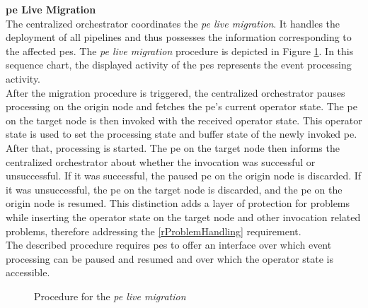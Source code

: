 \textbf{\acrlong{pe} Live Migration}\\
The centralized orchestrator coordinates the \textit{\acrshort{pe} live migration}. It handles the deployment of all pipelines and thus possesses the information corresponding to the affected \gls{pe}s. The \textit{\textit{\acrshort{pe} live migration}} procedure is depicted in Figure \ref{fOperatorStateMigration}. In this sequence chart, the displayed activity of the \gls{pe}s represents the event processing activity.\\
After the migration procedure is triggered, the centralized orchestrator pauses processing on the origin node and fetches the \gls{pe}'s current operator state. The \gls{pe} on the target node is then invoked with the received operator state. This operator state is used to set the processing state and buffer state of the newly invoked \gls{pe}. After that, processing is started. The \gls{pe} on the target node then informs the centralized orchestrator about whether the invocation was successful or unsuccessful. If it was successful, the paused \gls{pe} on the origin node is discarded. If it was unsuccessful, the \gls{pe} on the target node is discarded, and the \gls{pe} on the origin node is resumed. This distinction adds a layer of protection for problems while inserting the operator state on the target node and other invocation related problems, therefore addressing the \ref{rProblemHandling} requirement.\\
The described procedure requires \gls{pe}s to offer an interface over which event processing can be paused and resumed and over which the operator state is accessible.\par

\begin{figure}[H]
\centering
\graphicspath{{./figures/code/}}

\caption{Procedure for the \textit{\acrshort{pe} live migration}}
\label{fOperatorStateMigration}
\end{figure}


